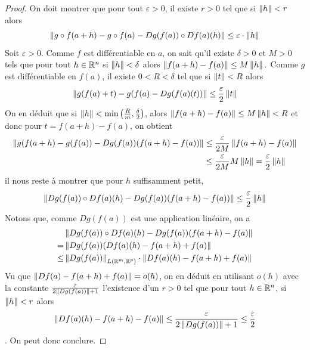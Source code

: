 \begin{proof}
    On doit montrer que pour tout $\varepsilon>0$, il existe $r>0$ tel que si $\left\| h \right\|<r$ alors 
    \begin{equation*}
        \left\| g\circ f(a+h)-g\circ f(a)-Dg(f(a))\circ Df(a)(h) \right\|\leq \varepsilon\cdot\left\| h \right\|
    \end{equation*}
    Soit $\varepsilon>0$. Comme $f$ est différentiable en $a$, on sait qu'il existe $\delta>0$ et $M>0$ tels que pour tout $h\in \mathbb{R}^n$ si $\left\| h \right\|<\delta$ alors $\left\| f(a+h)-f(a) \right\|\leq M\left\| h \right\|.$ Comme $g$ est différentiable en $f(a)$, il existe $0<R<\delta$ tel que si $\left\| t \right\|<R$ alors
    $$
    \left\| g(f(a)+t)-g(f(a)-Dg(f(a)(t)) \right\|\leq \frac{\varepsilon}{2}\left\| t \right\|
    $$
    On en déduit que si $\left\| h \right\|<\min\left(\frac{R}{m},\frac \delta 2\right)$, alors $\left\| f(a+h)-f(a) \right\|\leq M\left\| h \right\|<R$ et donc pour $t= f(a+h)-f(a)$, on obtient 
    \begin{align*}
        \left\| g(f(a+h)-g(f(a))-Dg(f(a))(f(a+h)-f(a)) \right\|
        &\leq \frac{\varepsilon}{2M}\left\| f(a+h)-f(a) \right\|\\
        &\leq \frac{\varepsilon}{2M}M\left\| h \right\|=\frac{\varepsilon}{2}\left\| h \right\|
    \end{align*}
    il nous reste à montrer que pour $h$ suffisamment petit, 
    \begin{equation*}
        \left\| Dg(f(a))\circ Df(a)(h)-Dg(f(a))(f(a+h)-f(a)) \right\|\leq \frac{\varepsilon}{2}\left\| h \right\|
    \end{equation*}
    Notons que, comme $Dg(f(a))$ est une application linéaire, on a
    \begin{align*}
        &\left\| Dg(f(a))\circ Df(a)(h)-Dg(f(a))(f(a+h)-f(a) \right\|\\
        =&\left\| Dg(f(a))(Df(a)(h)-f(a+h)+f(a) \right\|\\
        \le&\left\| Dg(f(a)) \right\|_{L(\mathbb{R}^m,\mathbb{R}^p)}\cdot\left\| Df(a)(h)-f(a+h)+f(a) \right\|
    \end{align*}
  Vu que $\left\| Df(a)-f(a+h)+f(a) \right\|=o(h)$, on en déduit en utilisant $o(h)$ avec la constante $\frac{\varepsilon}{2\left\| Dg(f(a)) \right\|+1}$ l'existence d'un $r>0$ tel que pour tout $h\in\mathbb{R}^n$, si $\left\| h \right\|<r$ alors  $$\left\| Df(a)(h)-f(a+h)-f(a) \right\|\leq \frac{\varepsilon}{2\left\| Dg(f(a)) \right\|+1}\le\frac\varepsilon2$$. On peut donc conclure.
\end{proof}
